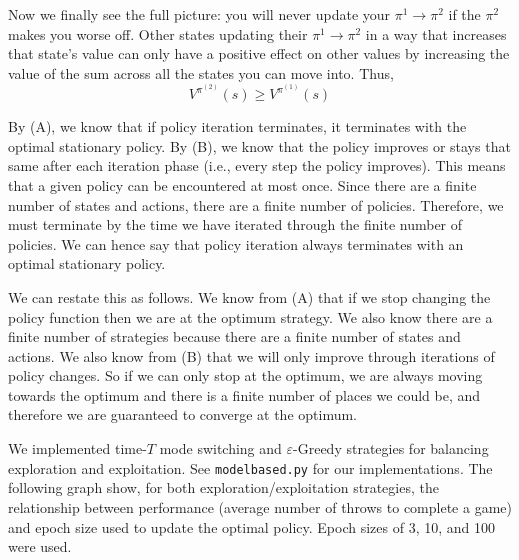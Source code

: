\documentclass[solution, letterpaper]{cs121}
\begin{document}
Now we finally see the full picture: you will never update your $\pi^1 \rightarrow \pi^2$ if the $\pi^2$ makes you worse off. Other states updating their $\pi^1 \rightarrow \pi^2$ in a way that increases that state's value can only have a positive effect on other values by increasing the value of the sum across all the states you can move into. Thus, \[ V^{\pi^{(2)}} (s) \ge V^{\pi^{(1)}}(s) \]

\subproblem{} %
By (A), we know that if policy iteration terminates, it terminates with the optimal stationary policy. By (B), we know that the policy improves or stays that same after each iteration phase (i.e., every step the policy improves). This means that a given policy can be encountered at most once. Since there are a finite number of states and actions, there are a finite number of policies. Therefore, we must terminate by the time we have iterated through the finite number of policies. We can hence say that policy iteration always terminates with an optimal stationary policy.

We can restate this as follows. We know from (A) that if we stop changing the policy function then we are at the optimum strategy. We also know there are a finite number of strategies because there are a finite number of states and actions. We also know from (B) that we will only improve through iterations of policy changes. So if we can only stop at the optimum, we are always moving towards the optimum and there is a finite number of places we could be, and therefore we are guaranteed to converge at the optimum.



\subproblem{} %
We implemented time-$T$ mode switching and $\varepsilon$-Greedy strategies for balancing exploration and exploitation. See {\tt modelbased.py} for our implementations. The following graph show, for both exploration/exploitation strategies, the relationship between performance (average number of throws to complete a game) and epoch size used to update the optimal policy. Epoch sizes of 3, 10, and 100 were used. 
\end{document}
